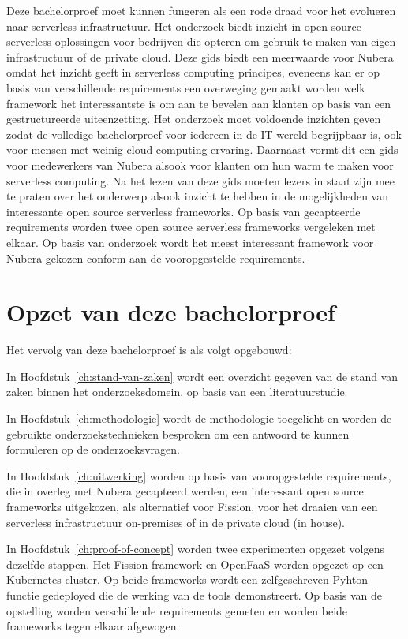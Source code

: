 Deze bachelorproef moet kunnen fungeren als een rode draad voor het evolueren naar serverless infrastructuur. Het onderzoek biedt inzicht in open source serverless oplossingen voor bedrijven die opteren om gebruik te maken van eigen infrastructuur of de private cloud. Deze gids biedt een meerwaarde voor Nubera omdat het inzicht geeft in serverless computing principes, eveneens kan er op basis van verschillende requirements een overweging gemaakt worden welk framework het interessantste is om aan te bevelen aan klanten op basis van een gestructureerde uiteenzetting. Het onderzoek moet voldoende inzichten geven zodat de volledige bachelorproef voor iedereen in de IT wereld begrijpbaar is, ook voor mensen met weinig cloud computing ervaring. Daarnaast vormt dit een gids voor medewerkers van Nubera alsook voor klanten om hun warm te maken voor serverless computing. Na het lezen van deze gids moeten lezers in staat zijn mee te praten over het onderwerp alsook inzicht te hebben in de mogelijkheden van interessante open source serverless frameworks. Op basis van gecapteerde requirements worden twee open source serverless frameworks vergeleken met elkaar. Op basis van onderzoek wordt het meest interessant framework voor Nubera gekozen conform aan de vooropgestelde requirements.


\section{Opzet van deze bachelorproef}
\label{sec:opzet-bachelorproef}

Het vervolg van deze bachelorproef is als volgt opgebouwd:

In Hoofdstuk~\ref{ch:stand-van-zaken} wordt een overzicht gegeven van de stand van zaken binnen het onderzoeksdomein, op basis van een literatuurstudie.

In Hoofdstuk~\ref{ch:methodologie} wordt de methodologie toegelicht en worden de gebruikte onderzoekstechnieken besproken om een antwoord te kunnen formuleren op de onderzoeksvragen.

In Hoofdstuk~\ref{ch:uitwerking} worden op basis van vooropgestelde requirements, die in overleg met Nubera gecapteerd werden, een interessant open source frameworks uitgekozen, als alternatief voor Fission, voor het draaien van een serverless infrastructuur on-premises of in de private cloud (in house).

In Hoofdstuk~\ref{ch:proof-of-concept} worden twee experimenten opgezet volgens dezelfde stappen. Het Fission framework en OpenFaaS worden opgezet op een Kubernetes cluster. Op beide frameworks wordt een zelfgeschreven Pyhton functie gedeployed die de werking van de tools demonstreert. Op basis van de opstelling worden verschillende requirements gemeten en worden beide frameworks tegen elkaar afgewogen.

